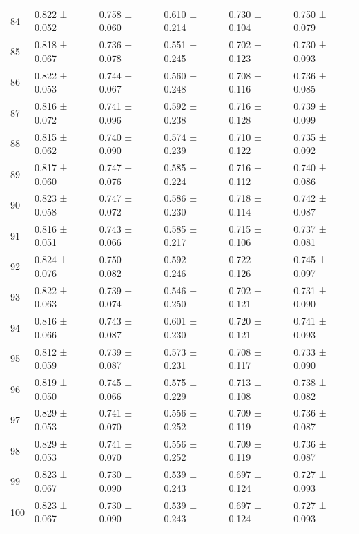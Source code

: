 \begin{tabular}{llllll}
84 & 0.822 ± 0.052 & 0.758 ± 0.060 & 0.610 ± 0.214 & 0.730 ± 0.104 & 0.750 ± 0.079 \\
85 & 0.818 ± 0.067 & 0.736 ± 0.078 & 0.551 ± 0.245 & 0.702 ± 0.123 & 0.730 ± 0.093 \\
86 & 0.822 ± 0.053 & 0.744 ± 0.067 & 0.560 ± 0.248 & 0.708 ± 0.116 & 0.736 ± 0.085 \\
87 & 0.816 ± 0.072 & 0.741 ± 0.096 & 0.592 ± 0.238 & 0.716 ± 0.128 & 0.739 ± 0.099 \\
88 & 0.815 ± 0.062 & 0.740 ± 0.090 & 0.574 ± 0.239 & 0.710 ± 0.122 & 0.735 ± 0.092 \\
89 & 0.817 ± 0.060 & 0.747 ± 0.076 & 0.585 ± 0.224 & 0.716 ± 0.112 & 0.740 ± 0.086 \\
90 & 0.823 ± 0.058 & 0.747 ± 0.072 & 0.586 ± 0.230 & 0.718 ± 0.114 & 0.742 ± 0.087 \\
91 & 0.816 ± 0.051 & 0.743 ± 0.066 & 0.585 ± 0.217 & 0.715 ± 0.106 & 0.737 ± 0.081 \\
92 & 0.824 ± 0.076 & 0.750 ± 0.082 & 0.592 ± 0.246 & 0.722 ± 0.126 & 0.745 ± 0.097 \\
93 & 0.822 ± 0.063 & 0.739 ± 0.074 & 0.546 ± 0.250 & 0.702 ± 0.121 & 0.731 ± 0.090 \\
94 & 0.816 ± 0.066 & 0.743 ± 0.087 & 0.601 ± 0.230 & 0.720 ± 0.121 & 0.741 ± 0.093 \\
95 & 0.812 ± 0.059 & 0.739 ± 0.087 & 0.573 ± 0.231 & 0.708 ± 0.117 & 0.733 ± 0.090 \\
96 & 0.819 ± 0.050 & 0.745 ± 0.066 & 0.575 ± 0.229 & 0.713 ± 0.108 & 0.738 ± 0.082 \\
97 & 0.829 ± 0.053 & 0.741 ± 0.070 & 0.556 ± 0.252 & 0.709 ± 0.119 & 0.736 ± 0.087 \\
98 & 0.829 ± 0.053 & 0.741 ± 0.070 & 0.556 ± 0.252 & 0.709 ± 0.119 & 0.736 ± 0.087 \\
99 & 0.823 ± 0.067 & 0.730 ± 0.090 & 0.539 ± 0.243 & 0.697 ± 0.124 & 0.727 ± 0.093 \\
100 & 0.823 ± 0.067 & 0.730 ± 0.090 & 0.539 ± 0.243 & 0.697 ± 0.124 & 0.727 ± 0.093 \\
\bottomrule
\end{tabular}

